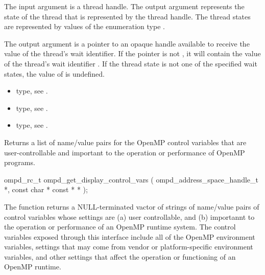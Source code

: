 \argdesc


The input argument  is a thread handle. The output argument
 represents the state of the thread that is represented by the thread handle.
The thread states are represented by values of the enumeration type
.

The output argument  is a pointer to an opaque handle available to receive the value 
of the thread's wait identifier. If the  pointer is not , it will contain
the value of the thread's wait identifier . If the thread state is not one of the 
specified wait states, the value of  is undefined.


\crossreferences
\begin{itemize}
	\item {} type, see .
	\item {} type, see .
	\item {} type, see .
\end{itemize}




\label{ompd:ompd_get_display_control_vars}
\label{sec:ompd_get_display_control_vars}
\summary
Returns a list of name/value pairs for the OpenMP control variables
that are user-controllable and important to the operation or
performance of OpenMP programs.
\format
\cspecificstart
\begin{boxedcode}
ompd\_rc\_t ompd\_get\_display\_control\_vars (
  ompd\_address\_space\_handle\_t *, 
  const char * const *  *
);
\end{boxedcode}
\cspecificend

\descr
The function  returns a
NULL-terminated vactor of strings of name/value pairs of control
variables whose settings are (a) user controllable,
and (b) importannt to the operation or performance of an OpenMP
runtime system.
The control variables exposed through this interface include all
of the OpenMP environment variables, settings that may come from
vendor or platform-specific environment variables, and other
settings that affect the operation or functioning of an OpenMP
runtime.

